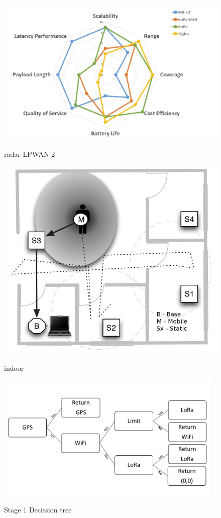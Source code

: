 \begin{figure}[htbp]
  \centering
  
    {\includegraphics[width=0.5\linewidth]{Chapters/Figures/radar2.jpg}}%
 
  \caption{radar LPWAN 2}
  \label{fig:radar2}
\end{figure}

\begin{figure}[htbp]
  \centering
  
    {\includegraphics[width=0.5\linewidth]{Chapters/Figures/indoor.JPG}}%
 
  \caption{indoor}
  \label{fig:indoor}
\end{figure}

\begin{figure}[htbp]
  \centering
  
    {\includegraphics[height= 2.4in,width=0.9\linewidth]{Chapters/Figures/Stage1tree.jpg}}%
 
  \caption{Stage 1 Decission tree}
  \label{fig:Stage1_DT}
\end{figure}

